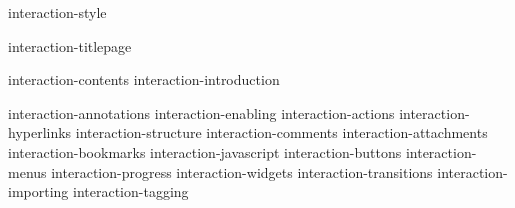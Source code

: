 \environment interaction-style

\setuplayout[bottom=1cm,bottomdistance=1cm]

\startdocument

    \component interaction-titlepage

    \startfrontmatter
        \component interaction-contents
        \component interaction-introduction
    \stopfrontmatter

    \startbodymatter
        \component interaction-annotations
        \component interaction-enabling
        \component interaction-actions
            \component interaction-hyperlinks
            \component interaction-structure
        \component interaction-comments
        \component interaction-attachments
        \component interaction-bookmarks
        \component interaction-javascript
        \component interaction-buttons
            \component interaction-menus
            \component interaction-progress
            \component interaction-widgets
        \component interaction-transitions
        \component interaction-importing
        \component interaction-tagging
    \stopbodymatter

\stopdocument

